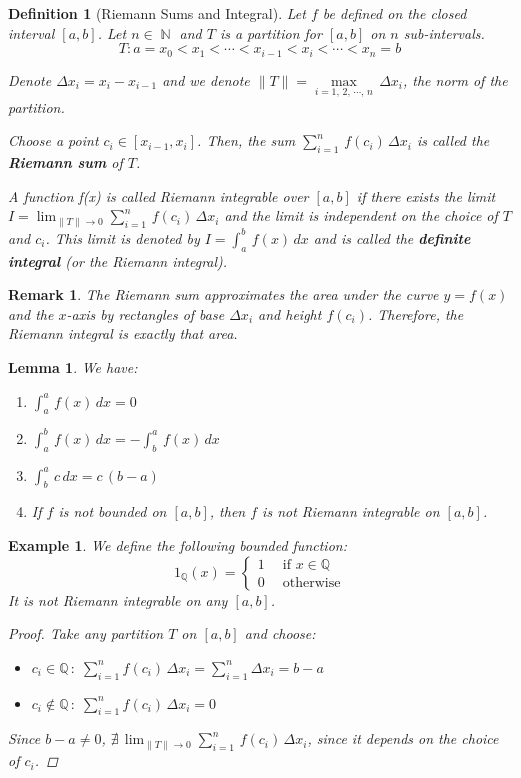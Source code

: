 \documentclass[12pt]{article}
\DeclareMathOperator{\N}{\mathbb{N}}
\newtheorem{definition}{Definition}[subsection]
\newtheorem{lemma}{Lemma}[subsection]
\newtheorem{example}{Example}[subsection]
\newtheorem{remark}{Remark}[subsection]
\begin{document}
\begin{definition}[Riemann Sums and Integral]
  Let $f$ be defined on the closed interval $[a,b]$. Let $n\in\N$ and $T$ is a partition for $[a,b]$ on $n$ sub-intervals. $$T: a=x_0<x_1<\cdots<x_{i-1}<x_i<\cdots<x_n=b$$

  Denote $\Delta x_i=x_i-x_{i-1}$ and we denote $\|T\|=\max\limits_{i=1,\,2,\,\cdots,\,n}\,\Delta x_i$, the norm of the partition.
  
  Choose a point $c_i\in[x_{i-1},x_i]$. Then, the sum $\displaystyle\sum_{i=1}^n\,f(c_i)\,\Delta x_i$ is called the \textbf{Riemann sum} of $T$.
  
  A function f(x) is called Riemann integrable over $[a,b]$ if there exists the limit $\displaystyle I=\lim_{\|T\|\to 0}\sum_{i=1}^n\,f(c_i)\,\Delta x_i$ and the limit is independent on the choice of $T$ and $c_i$. This limit is denoted by $\displaystyle I=\int_a^b\,f(x)\,dx$ and is called the \textbf{definite integral} (or the Riemann integral).
\end{definition}

\begin{remark}
  The Riemann sum approximates the area under the curve $y=f(x)$ and the $x$-axis by rectangles of base $\Delta x_i$ and height $f(c_i)$. Therefore, the Riemann integral is \textit{exactly} that area.
\end{remark}

\begin{lemma}
  We have:
  \begin{enumerate}
    \item $\displaystyle\int_a^a\,f(x)\,dx=0$
    \item $\displaystyle\int_a^b\,f(x)\,dx=-\int_b^a\,f(x)\,dx$
    \item $\displaystyle\int_b^a\,c\,dx=c\,(b-a)$
    \item If $f$ is not bounded on $[a,b]$, then $f$ is not Riemann integrable on $[a,b]$.
  \end{enumerate}
\end{lemma}

\begin{example}
  We define the following bounded function: $$
  1_\mathbb{Q}(x)=\begin{cases}
    1\,&\text{ if }x\in \mathbb{Q}\\
    0\,&\text{ otherwise}
  \end{cases}$$
  It is not Riemann integrable on any $[a,b]$.
  \begin{proof}
    Take any partition $T$ on $[a,b]$ and choose:
    \begin{itemize}
      \item $\displaystyle c_i\in\mathbb{Q}\,:\;\sum_{i=1}^n f(c_i)\,\Delta x_i=\sum_{i=1}^n \Delta x_i=b-a$
      \item $\displaystyle c_i\notin\mathbb{Q}\,:\;\sum_{i=1}^n f(c_i)\,\Delta x_i=0$
    \end{itemize}
    Since $b-a\neq 0$, $\displaystyle\nexists\,\lim_{\|T\|\to 0}\sum_{i=1}^n\,f(c_i)\,\Delta x_i$, since it depends on the choice of $c_i$.
  \end{proof}
\end{example}
\end{document}
